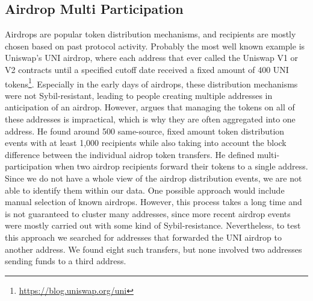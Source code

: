\documentclass[12pt,a4paper,titlepage,oneside,english]{article}
\begin{document}
\subsection{Airdrop Multi Participation}
Airdrops are popular token distribution mechanisms, and recipients are mostly chosen based on past protocol activity. Probably the most well known example is Uniswap's UNI airdrop, where each address that ever called the Uniswap V1 or V2 contracts until a specified cutoff date received a fixed amount of 400 UNI tokens\footnote{\url{https://blog.uniswap.org/uni}}. Especially in the early days of airdrops, these distribution mechanisms were not Sybil-resistant, leading to people creating multiple addresses in anticipation of an airdrop. However, \cite{FV:17} argues that managing the tokens on all of these addresses is impractical, which is why they are often aggregated into one address. He found around 500 same-source, fixed amount token distribution events with at least 1,000 recipients while also taking into account the block difference between the individual aidrop token transfers. He defined multi-participation when two airdrop recipients forward their tokens to a single address. Since we do not have a whole view of the airdrop distribution events, we are not able to identify them within our data. One possible approach would include manual selection of known airdrops. However, this process takes a long time and is not guaranteed to cluster many addresses, since more recent airdrop events were mostly carried out with some kind of Sybil-resistance. Nevertheless, to test this approach we searched for addresses that forwarded the UNI airdrop to another address. We found eight such transfers, but none involved two addresses sending funds to a third address.
\end{document}

